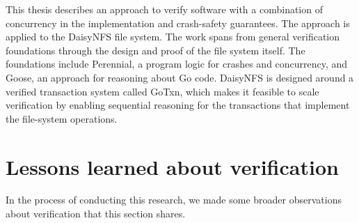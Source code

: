 This thesis describes an approach to verify software with a combination of
concurrency in the implementation and crash-safety guarantees. The approach is applied to the
DaisyNFS file system. The work spans from general verification foundations
through the design and proof of the file system itself. The foundations
include Perennial, a program logic for crashes and concurrency, and Goose, an
approach for reasoning about Go code. DaisyNFS is designed around a verified
transaction system called GoTxn, which makes it feasible to scale verification
by enabling sequential reasoning for the transactions that implement the
file-system operations.

\section{Lessons learned about verification}

In the process of conducting this research, we made some broader
observations about verification that this section shares.


